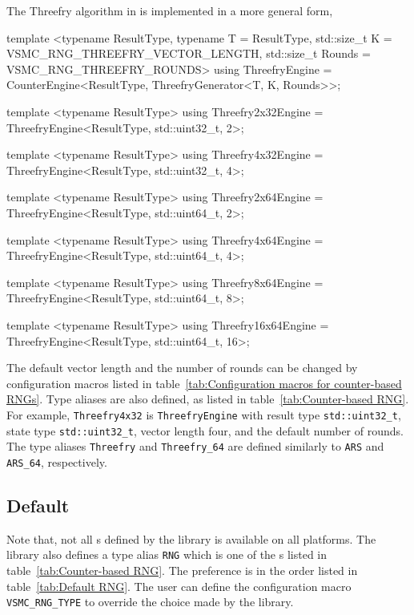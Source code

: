 The Threefry algorithm in \textcite{Salmon:2011um} is implemented in a more
general form,
\begin{cppcode}
  template <typename ResultType, typename T = ResultType,
      std::size_t K = VSMC_RNG_THREEFRY_VECTOR_LENGTH,
      std::size_t Rounds = VSMC_RNG_THREEFRY_ROUNDS>
  using ThreefryEngine =
      CounterEngine<ResultType, ThreefryGenerator<T, K, Rounds>>;

  template <typename ResultType>
  using Threefry2x32Engine = ThreefryEngine<ResultType, std::uint32_t, 2>;

  template <typename ResultType>
  using Threefry4x32Engine = ThreefryEngine<ResultType, std::uint32_t, 4>;

  template <typename ResultType>
  using Threefry2x64Engine = ThreefryEngine<ResultType, std::uint64_t, 2>;

  template <typename ResultType>
  using Threefry4x64Engine = ThreefryEngine<ResultType, std::uint64_t, 4>;

  template <typename ResultType>
  using Threefry8x64Engine = ThreefryEngine<ResultType, std::uint64_t, 8>;

  template <typename ResultType>
  using Threefry16x64Engine = ThreefryEngine<ResultType, std::uint64_t, 16>;
\end{cppcode}
The default vector length and the number of rounds can be changed by
configuration macros listed in table~\ref{tab:Configuration macros for
  counter-based RNGs}. Type aliases are also defined, as listed in
table~\ref{tab:Counter-based RNG}. For example, \verb|Threefry4x32| is
\verb|ThreefryEngine| with result type \verb|std::uint32_t|, state type
\verb|std::uint32_t|, vector length four, and the default number of rounds. The
type aliases \verb|Threefry| and \verb|Threefry_64| are defined similarly to
\verb|ARS| and \verb|ARS_64|, respectively.

\subsection{Default \protect\rng}
\label{sub:Default RNG}

Note that, not all \rng{}s defined by the library is available on all
platforms. The library also defines a type alias \verb|RNG| which is one of the
\rng{}s listed in table~\ref{tab:Counter-based RNG}. The preference is in the
order listed in table~\ref{tab:Default RNG}. The user can define the
configuration macro \verb|VSMC_RNG_TYPE| to override the choice made by the
library.

